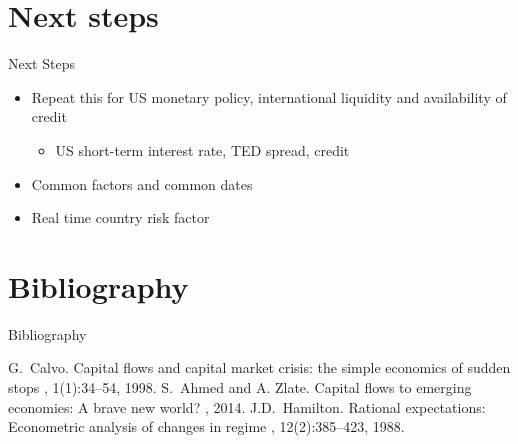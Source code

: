 \documentclass[14pt,xcolor=pdftex,dvipsnames,table]{beamer}
\begin{document}
\section{Next steps}
\begin{frame}{Next Steps}
\begin{itemize}[<+-| alert@+>]
\item Repeat this for US monetary policy, international liquidity and availability of credit
\begin{itemize}
\item US short-term interest rate, TED spread, credit
\end{itemize}
\item Common factors and common dates
\item Real time country risk factor
\end{itemize}
\end{frame}

\section{Bibliography}

\begin{frame}[allowframebreaks]{Bibliography}
  \begin{thebibliography}{10}    
  \beamertemplatearticlebibitems
    G.~Calvo.
    \newblock Capital flows and capital market crisis: the simple economics of sudden stops
    , 1(1):34--54, 1998.
    S.~Ahmed and A. Zlate.
    \newblock Capital flows to emerging economies: A brave new world?
    , 2014.
    J.D.~Hamilton.
    \newblock Rational expectations: Econometric analysis of changes in regime
    , 12(2):385--423, 1988.
  
  \end{thebibliography}
\end{frame}
\end{document}
